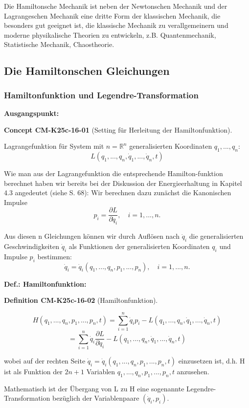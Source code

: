 \documentclass[10pt, letterpaper]{article}
\newcommand{\CustomHeading}[3]{%
  \par\medskip\noindent%
  \textbf{#1 #2} \textnormal{(#3)}.\enskip%
}
\newenvironment{DEF}[2]{\begin{unitbox}\CustomHeading{Definition}{#1}{#2}}{\end{unitbox}}
\newenvironment{CONC}[2]{\begin{unitbox}\CustomHeading{Concept}{#1}{#2}}{\end{unitbox}}
\begin{document}
Die Hamiltonsche Mechanik ist neben der Newtonschen Mechanik und der Lagrangeschen Mechanik eine dritte Form der klassischen Mechanik, die besonders gut geeignet ist, die klassische Mechanik zu verallgemeinern und moderne physikalische Theorien zu entwickeln, z.B. Quantenmechanik, Statistische Mechanik, Chaostheorie.



\subsection{Die Hamiltonschen Gleichungen}



\subsubsection*{Hamiltonfunktion und Legendre-Transformation}

\textbf{Ausgangspunkt:} 


\begin{CONC}{CM-K25c-16-01}{Setting für Herleitung der Hamiltonfunktion}
Lagrangefunktion für System mit $n=\mathbb{R}^n$ generalisierten Koordinaten $q_1,...,q_n$:
\[
L(q_1,...,q_n,\dot{q}_1,...,\dot{q}_n,t)
\]

Wie man aus der Lagrangefunktion die entsprechende Hamilton-funktion berechnet haben wir bereits bei der Diskussion der Energieerhaltung in Kapitel 4.3 angedeutet (siehe S. 68):
Wir berechnen dazu zunächst die Kanonischen Impulse
\[
p_i = \frac{\partial L}{\partial \dot{q}_i}, \quad i=1,...,n.
\]

Aus diesen n Gleichungen können wir durch Auflösen nach $\dot{q}_i$ die generalisierten Geschwindigkeiten $\dot{q}_i$ als Funktionen der generalisierten Koordinaten $q_i$ und Impulse $p_i$ bestimmen:
\[
\dot{q}_i = \dot{q}_i(q_1,...,q_n,p_1,...,p_n), \quad i=1,...,n.
\]
\end{CONC}


\textbf{Def.: Hamiltonfunktion:}

\begin{DEF}{CM-K25c-16-02}{Hamiltonfunktion}
\[
H(q_1,...,q_n,p_1,...,p_n,t) = \sum_{i=1}^n \dot{q}_i p_i - L(q_1,...,q_n,\dot{q}_1,...,\dot{q}_n,t)
\]
\[
= \sum_{i=1}^n \dot{q}_i \frac{\partial L}{\partial \dot{q}_i} - L(q_1,...,q_n,\dot{q}_1,...,\dot{q}_n,t)
\]

wobei auf der rechten Seite $\dot{q}_i = \dot{q}_i(q_1,...,q_n,p_1,...,p_n,t)$ einzusetzen ist, d.h. H ist als Funktion der $2n+1$ Variablen $q_1,...,q_n,p_1,...,p_n,t$ anzusehen.

Mathematisch ist der Übergang von L zu H eine sogenannte Legendre-Transformation bezüglich der Variablenpaare $(\dot{q}_i,p_i)$.
\end{DEF}
\end{document}
